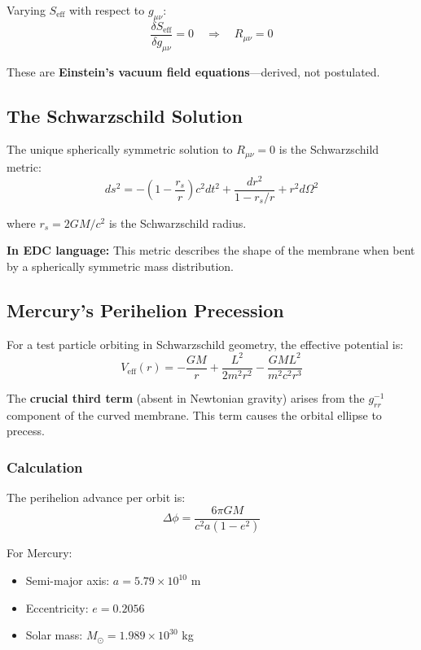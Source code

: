 Varying $S_{\text{eff}}$ with respect to $g_{\mu\nu}$:
\begin{equation}
\frac{\delta S_{\text{eff}}}{\delta g_{\mu\nu}} = 0 \quad \Rightarrow \quad \boxed{R_{\mu\nu} = 0}
\end{equation}

These are \textbf{Einstein's vacuum field equations}---derived, not postulated.

\subsection{The Schwarzschild Solution}

The unique spherically symmetric solution to $R_{\mu\nu} = 0$ is the Schwarzschild metric:
\begin{equation}
\boxed{ds^2 = -\left(1 - \frac{r_s}{r}\right)c^2 dt^2 + \frac{dr^2}{1 - r_s/r} + r^2 d\Omega^2}
\end{equation}

where $r_s = 2GM/c^2$ is the Schwarzschild radius.

\textbf{In EDC language:} This metric describes the shape of the membrane when bent by a spherically symmetric mass distribution.

\subsection{Mercury's Perihelion Precession}

For a test particle orbiting in Schwarzschild geometry, the effective potential is:
\begin{equation}
V_{\text{eff}}(r) = -\frac{GM}{r} + \frac{L^2}{2m^2 r^2} - \frac{GML^2}{m^2 c^2 r^3}
\end{equation}

The \textbf{crucial third term} (absent in Newtonian gravity) arises from the $g_{rr}^{-1}$ component of the curved membrane. This term causes the orbital ellipse to precess.

\subsubsection{Calculation}

The perihelion advance per orbit is:
\begin{equation}
\Delta\phi = \frac{6\pi GM}{c^2 a(1-e^2)}
\end{equation}

For Mercury:
\begin{itemize}
    \item Semi-major axis: $a = 5.79 \times 10^{10}$ m
    \item Eccentricity: $e = 0.2056$
    \item Solar mass: $M_\odot = 1.989 \times 10^{30}$ kg
\end{itemize}

